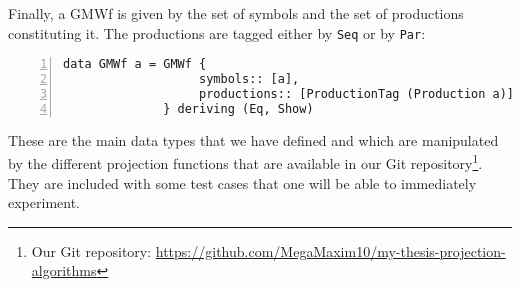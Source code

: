 Finally, a GMWf is given by the set of symbols and the set of productions constituting it. The productions are tagged either by \Verb|Seq| or by \Verb|Par|:
\begin{Verbatim}[frame=lines, fontsize=\small, numbers=left, numbersep=8pt]
data GMWf a = GMWf {
                   symbols:: [a], 
                   productions:: [ProductionTag (Production a)]
              } deriving (Eq, Show)
\end{Verbatim}


These are the main data types that we have defined and which are manipulated by the different projection functions that are available in our Git repository\footnote{Our Git repository: \url{https://github.com/MegaMaxim10/my-thesis-projection-algorithms}}. They are included with some test cases that one will be able to immediately experiment.


\myRestoreMarks

